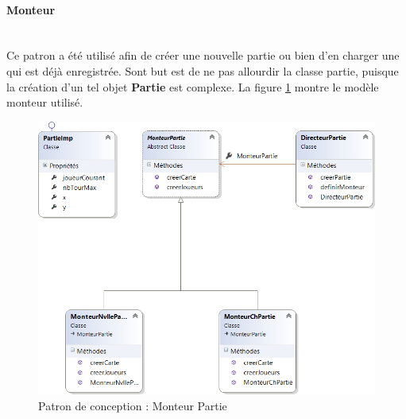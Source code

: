 \documentclass[a4paper,11pt]{article}
\begin{document}
\paragraph{Monteur}\mbox{}\medskip\\
Ce patron a été utilisé afin de créer une nouvelle partie ou bien d'en charger une qui est déjà enregistrée. Sont but est de ne pas allourdir la classe partie, puisque la création d'un tel objet \textbf{Partie} est complexe. La figure \ref{pc:mp} montre le modèle monteur utilisé.
\begin{figure}[H]
	\centering
	\includegraphics[width=\textwidth]{fig/monteur_partie}
	\caption{Patron de conception : Monteur Partie}
	\label{pc:mp}
\end{figure}
\end{document}
